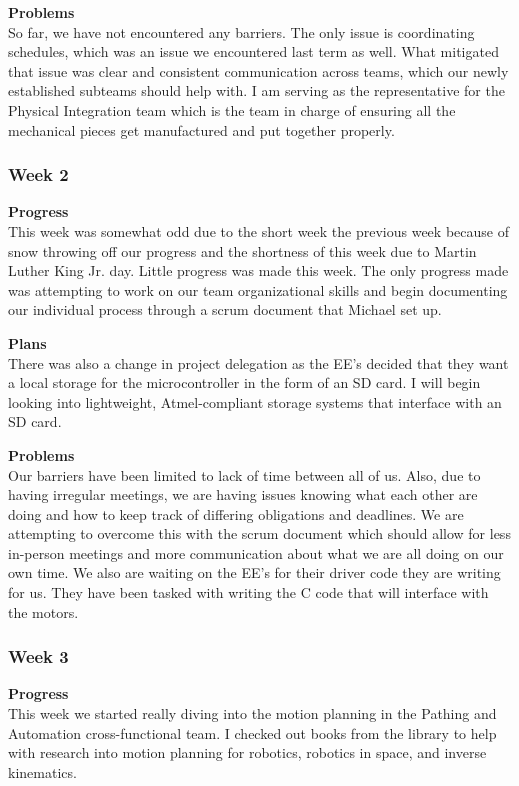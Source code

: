 \textbf{Problems} \\ 
So far, we have not encountered any barriers. The only issue is coordinating schedules, which was an issue we 
encountered last term as well. What mitigated that issue was clear and consistent communication across teams, which
our newly established subteams should help with. I am serving as the representative for the Physical Integration team
which is the team in charge of ensuring all the mechanical pieces get manufactured and put together properly. 


\subsubsection{Week 2}
\textbf{Progress} \\ 
This week was somewhat odd due to the short week the previous week because of snow throwing off our progress and the
 shortness of this week due to Martin Luther King Jr. day. Little progress was made this week. The only progress made
 was attempting to work on our team organizational skills and begin documenting our individual process through a 
 scrum document that Michael set up. 

\textbf{Plans} \\
There was also a change in project delegation as the EE's decided that they want a local storage for the 
microcontroller in the form of an SD card. I will begin looking into lightweight, Atmel-compliant storage systems
that interface with an SD card.

\textbf{Problems} \\ 
Our barriers have been limited to lack of time between all of us. Also, due to having irregular meetings, we are
having issues knowing what each other are doing and how to keep track of differing obligations and deadlines.
We are attempting to overcome this with the scrum document which should allow for less in-person meetings
and more communication about what we are all doing on our own time. We also are waiting on the EE's for their driver 
code they are writing for us. They have been tasked with writing the C code that will interface with the motors.

\subsubsection{Week 3}
\textbf{Progress} \\ 
This week we started really diving into the motion planning in the Pathing and Automation cross-functional team. I checked out books from the library to help with research into motion planning for robotics, robotics in space, and inverse kinematics.

